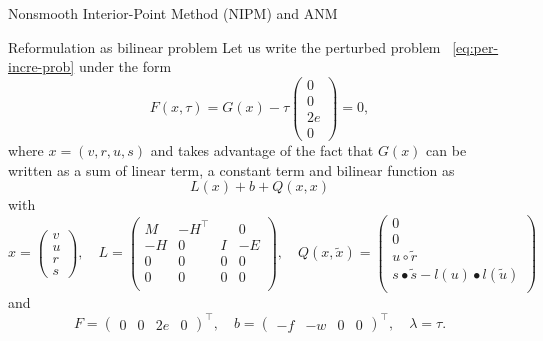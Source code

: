   \begin{frame}{Nonsmooth Interior-Point Method (NIPM) and ANM}
    \begin{block}{Reformulation as bilinear problem}
      Let us write the perturbed problem ~\eqref{eq:per-incre-prob} under the form
      \begin{equation}
        \label{eq:F}
        F(x,\tau) = G(x)-\tau \begin{pmatrix} 0\\0\\2e \\0\end{pmatrix} = 0,
      \end{equation}
      where $x=(v,r,u,s)$ and takes advantage of the fact that $G(x)$ can be written as a sum of linear term, a constant term and bilinear function as
\begin{equation}
  \label{eq:1000000}
  L(x) + b + Q(x,x) 
\end{equation}
with
\begin{equation}
  \label{eq:18}
  x =
  \begin{pmatrix}
   v \\ u \\ r \\ s 
  \end{pmatrix},\quad
   L =
   \begin{pmatrix}
     M &  -H^\top &   & 0\\
     -H & 0 & I & -E \\
     0 & 0 & 0 & 0 \\
     0 & 0 & 0 & 0\\
  \end{pmatrix},\quad
  Q(x,\tilde x) =
  \begin{pmatrix}
    0 \\
    0 \\
    u \circ \tilde r\\
    s\bullet  \tilde s - l(u) \bullet  l(\tilde u )\\
  \end{pmatrix}
\end{equation}
and
\begin{equation}
  F =
  \begin{pmatrix}
    0 &
    0 &
    2 e &
    0
  \end{pmatrix}^\top,\quad
  b =
  \begin{pmatrix}
    - f&
    - w &
    0 &
    0
  \end{pmatrix}^\top,\quad \lambda= \tau.
\end{equation}
\end{block}
\end{frame}


